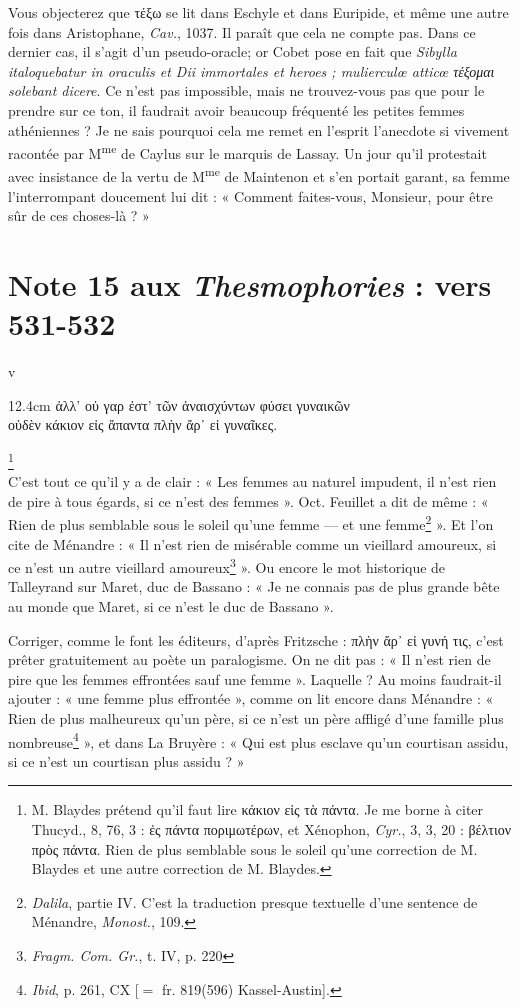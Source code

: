 \documentclass{book}%
\newcommand{\italique}[1]{\textit{#1}}%
\newcommand{\espace}[1]{\hspace{#1}}%
\newcommand{\expo}[1]{\textsuperscript{#1}}%
\newcommand{\fantome}{{\color{white}v}}
\newcommand{\Note}[1]{\section*{#1}%
\addcontentsline{toc}{section}{#1}}
\newcommand{\note}[1]{\footnote{#1}}
\newcommand{\citComm}[1]{\fantome\\
\espace{1cm}\begin{minipagewithmarginpars}{12.4cm}%
#1
\end{minipagewithmarginpars}%
}
\begin{document}
Vous objecterez que τέξω se lit dans Eschyle et dans Euripide, et même une autre fois dans Aristophane, \italique{Cav.}, 1037. Il paraît que cela ne compte pas. Dans ce dernier cas, il s'agit d'un pseudo-oracle; or Cobet pose en fait que \italique{Sibylla italoquebatur in oraculis et Dii immortales et heroes ; mulierculœ atticœ τέξομαι solebant dicere}. Ce n'est pas impossible, mais ne trouvez-vous pas que pour le prendre sur ce ton, il faudrait avoir beaucoup fréquenté les petites femmes athéniennes ? Je ne sais pourquoi cela me remet en l'esprit l'anecdote si vivement racontée par M\expo{me} de Caylus sur le marquis de Lassay. Un jour qu'il protestait avec insistance de la vertu de M\expo{me} de Maintenon et s'en portait garant, sa femme l'interrompant doucement lui dit : « Comment faites-vous, Monsieur, pour être sûr de ces choses-là ? »

\Note{Note 15 aux \italique{Thesmophories} : vers 531-532}


\citComm{ἀλλ' οὐ γαρ ἐστ' τῶν ἀναισχύντων φύσει γυναικῶν\\
οὐδὲν κάκιον εἰς ἅπαντα πλὴν ἄρ᾽ εἰ γυναῖκες.}\note{M. Blaydes prétend qu'il faut lire κάκιον εἰς τὰ πάντα. Je me borne à citer Thucyd., 8, 76, 3 : ἐς πάντα ποριμωτέρων, et Xénophon, \italique{Cyr.}, 3, 3, 20 : βέλτιον πρὸς πάντα. Rien de plus semblable sous le soleil qu'une correction de M. Blaydes et une autre correction de M. Blaydes.}\\

C'est tout ce qu'il y a de clair : « Les femmes au naturel impudent, il n'est rien de pire à tous égards, si ce n'est des femmes ». 
Oct. Feuillet a dit de même : « Rien de plus semblable sous le soleil qu'une femme — et une femme\note{\italique{Dalila}, partie IV. C'est la traduction presque textuelle d'une sentence de Ménandre, \italique{Monost.}, 109.} ». Et l'on cite de Ménandre : « Il n'est rien de misérable comme un vieillard amoureux, si ce n'est un autre vieillard amoureux\note{\italique{Fragm. Com. Gr.}, t. IV, p. 220} ». Ou encore le mot historique de Talleyrand sur Maret, duc de Bassano : « Je ne connais pas de plus grande bête au monde que Maret, si ce n'est le duc de Bassano ». 

Corriger, comme le font les éditeurs, d'après Fritzsche : πλὴν ἄρ᾽ εἰ γυνή τις, c'est prêter gratuitement au poète un paralogisme. On ne dit pas : « Il n'est rien de pire que les femmes effrontées sauf une femme ». Laquelle ? Au moins faudrait-il ajouter : « une femme plus effrontée », comme on lit encore dans Ménandre : « Rien de plus malheureux qu'un père, si ce n'est un père affligé d'une famille plus nombreuse\note{\italique{Ibid}, p. 261, CX [$=$ fr. 819(596) Kassel-Austin].} », et dans La Bruyère : « Qui est plus esclave qu'un courtisan assidu, si ce n'est un courtisan plus assidu ? » 
\end{document}
